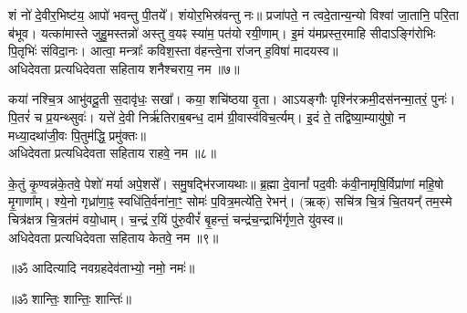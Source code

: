 शं नो॑ दे॒वीर॒भिष्ट॑य॒ आपो॑ भवन्तु पी॒तये᳚। शंयोर॒भिस्र॑वन्तु नः॥ प्रजा॑पते॒ न त्वदे॒तान्य॒न्यो विश्वा॑ जा॒तानि॒ परि॒ता ब॑भूव। यत्का॑मास्ते जुहु॒मस्तन्नो॑ अस्तु व॒यꣴ स्या॑म॒ पत॑यो रयी॒णाम्। इ॒मं य॑मप्रस्त॒रमाहि सीदाऽङ्गि॑रोभिः पि॒तृभिः॑ संविदा॒नः। आत्वा॒ मन्त्राः᳚ कविश॒स्ता व॑हन्त्वे॒ना रा॑जन् ह॒विषा॑ मादयस्व॥ \\
अधिदेवता प्रत्यधिदेवता सहिताय शनैश्चराय॒ नम॥७॥ 

कया॑ नश्चि॒त्र आभु॑वदू॒ती स॒दावृ॑धः॒ सखा᳚। कया॒ शचि॑ष्ठया वृ॒ता। आऽयङ्गौः पृश्नि॑रक्रमी॒दस॑नन्मा॒तरं॒ पुनः॑। पि॒तरं॑ च प्र॒यन्थ्सुवः॑। यत्ते॑ दे॒वी निर्ऋ॑तिराब॒बन्ध॒ दाम॑ ग्री॒वास्व॑विच॒र्त्यम्। इ॒दं  ते॒ तद्विष्या॒म्यायु॑षो॒ न मध्या॒दथा॑जी॒वः पि॒तुम॑द्धि॒ प्रमु॑क्तः॥ \\
अधिदेवता प्रत्यधिदेवता सहिताय राहवे॒ नम॥८॥ 

के॒तुं कृ॒ण्वन्न॑के॒तवे॒ पेशो॑ मर्या अपे॒शसे᳚। समु॒षद्भि॑रजायथाः॥ ब्र॒ह्मा दे॒वानां᳚ पद॒वीः क॑वी॒नामृषि॒र्विप्रा॑णां महि॒षो मृ॒गाणा᳚म्। श्ये॒नो गृध्रा॑णा॒ꣴ॒ स्वधि॑ति॒र्वना॑ना॒ꣳ॒ सोमः॑ प॒वित्र॒मत्ये॑ति॒ रेभन्॑। (ऋक्) सचि॑त्र चि॒त्रं चि॒तयन्᳚ तम॒स्मे चित्र॑क्षत्र चि॒त्रत॑मं वयो॒धाम्। च॒न्द्रं र॒यिं पु॑रु॒वीरं᳚ बृ॒हन्तं॒ चन्द्र॑च॒न्द्राभि॑र्गृण॒ते यु॑वस्व॥ \\
अधिदेवता प्रत्यधिदेवता सहिताय केतवे॒ नम॥९॥ 

\centerline{॥ॐ आदित्यादि नवग्रहदेव॑ताभ्यो॒ नमो॒ नमः॑॥ }

\centerline{॥ॐ शान्तिः॒ शान्तिः॒ शान्तिः॑॥}